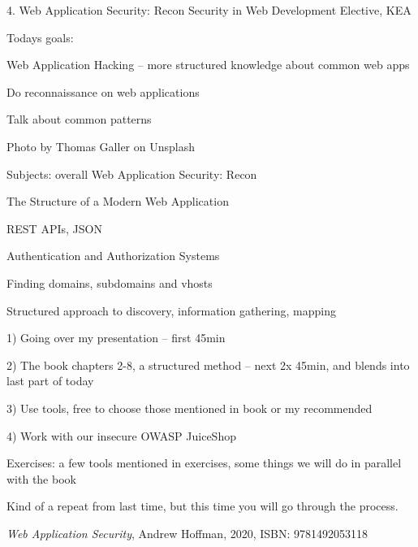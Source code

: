 \documentclass[Screen16to9,17pt]{foils}
\begin{document}
\mytitlepage
{4. Web Application Security: Recon}
{Security in Web Development Elective, KEA}



Todays goals:
\begin{list2}
\item Web Application Hacking -- more structured knowledge about common web apps
\item Do reconnaissance on web applications
\item Talk about common patterns
\end{list2}

{\small   Photo by Thomas Galler on Unsplash}




\begin{list1}
\item Subjects: overall Web Application Security: Recon
\item The Structure of a Modern Web Application
\item REST APIs, JSON
\item Authentication and Authorization Systems
\item Finding domains, subdomains and vhosts
\begin{list2}
\item Structured approach to discovery, information gathering, mapping
\item 1) Going over my presentation -- first 45min
\item 2) The book chapters 2-8, a structured method -- next 2x 45min, and blends into last part of today
\item 3) Use tools, free to choose those mentioned in book or my recommended
\item 4) Work with our insecure OWASP JuiceShop
\end{list2}
\item Exercises: a few tools mentioned in exercises, some things we will do in parallel with the book
\end{list1}

Kind of a repeat from last time, but this time you will go through the process.


\emph{Web Application Security}, Andrew Hoffman, 2020, ISBN: 9781492053118
\end{document}
